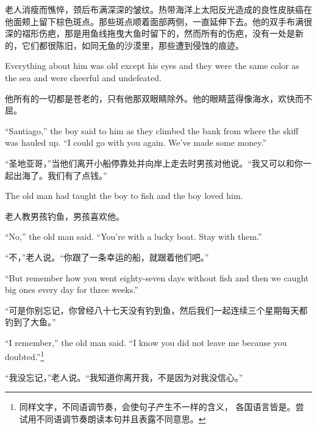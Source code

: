 \begin{paracol}{2}
\switchcolumn

老人消瘦而憔悴，颈后布满深深的皱纹。热带海洋上太阳反光造成的良性皮肤癌在他面颊上留下棕色斑点。那些斑点顺着面部两侧，一直延伸下去。他的双手布满很深的褶形伤疤，那是用鱼线拖曳大鱼时留下的，然而所有的伤疤，没有一处是新的，它们都很陈旧，如同无鱼的沙漠里，那些遭到侵蚀的痕迹。

\switchcolumn*

Everything about him was old \gls{except} his eyes and they were the same
color as the sea and were \gls{cheerful} and \gls{undefeated}.

\switchcolumn

他所有的一切都是苍老的，只有他那双眼睛除外。他的眼睛蓝得像海水，欢快而不屈。

\switchcolumn*

``Santiago,'' the boy said to him as they climbed the \gls{bank} from where the
skiff was \gls{hauled} up. ``I could go with you again. We've made some money.''

\switchcolumn

“圣地亚哥，”当他们离开小船停靠处并向岸上走去时男孩对他说。“我又可以和你一起出海了。我们有了点钱。”

\switchcolumn*

The old man had taught the boy to fish and the boy loved him.

\switchcolumn

老人教男孩钓鱼，男孩喜欢他。

\switchcolumn*

``No,'' the old man said. ``You're with a lucky boat. Stay with them.''

\switchcolumn

“不，”老人说。“你跟了一条幸运的船，就跟着他们吧。”

\switchcolumn*

``But remember how you went eighty-seven days without fish and then we caught big ones every day for three weeks.''

\switchcolumn

“可是你别忘记，你曾经八十七天没有钓到鱼，然后我们一起连续三个星期每天都钓到了大鱼。”

\switchcolumn*

``I remember,'' the old man said. ``I know you did not leave me because you
\gls{doubted}.''\footnote{同样文字，不同语调节奏，会使句子产生不一样的含义，
  各国语言皆是。尝试用不同语调节奏朗读本句并且表露不同意思。}

\switchcolumn

“我没忘记，”老人说。“我知道你离开我，不是因为对我没信心。”


\end{paracol}
